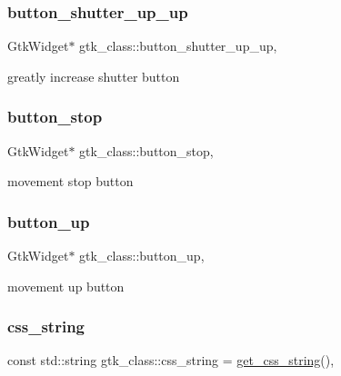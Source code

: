 \subsubsection{\texorpdfstring{button\+\_\+shutter\+\_\+up\+\_\+up}{button\_shutter\_up\_up}}
{\footnotesize\ttfamily Gtk\+Widget$\ast$ gtk\+\_\+class\+::button\+\_\+shutter\+\_\+up\+\_\+up\hspace{0.3cm}{\ttfamily [inline]}, {\ttfamily [static]}}

greatly increase shutter button \mbox{\label{classgtk__class_abf3f76bf2b007424210c597d954e7128}} 
\subsubsection{\texorpdfstring{button\+\_\+stop}{button\_stop}}
{\footnotesize\ttfamily Gtk\+Widget$\ast$ gtk\+\_\+class\+::button\+\_\+stop\hspace{0.3cm}{\ttfamily [inline]}, {\ttfamily [static]}}

movement stop button \mbox{\label{classgtk__class_aabb26f9d552a0a7e1177ec74feb838ff}} 
\subsubsection{\texorpdfstring{button\+\_\+up}{button\_up}}
{\footnotesize\ttfamily Gtk\+Widget$\ast$ gtk\+\_\+class\+::button\+\_\+up\hspace{0.3cm}{\ttfamily [inline]}, {\ttfamily [static]}}

movement up button \mbox{\label{classgtk__class_a5cb715b2c56782b35912923c022cb08e}} 
\subsubsection{\texorpdfstring{css\+\_\+string}{css\_string}}
{\footnotesize\ttfamily const std\+::string gtk\+\_\+class\+::css\+\_\+string = \hyperlink{gtk__LunAero_8hpp_adb72df5ed4fc630244a078d8d8634b1d}{get\+\_\+css\+\_\+string}()\hspace{0.3cm}{\ttfamily [inline]}, {\ttfamily [static]}}

